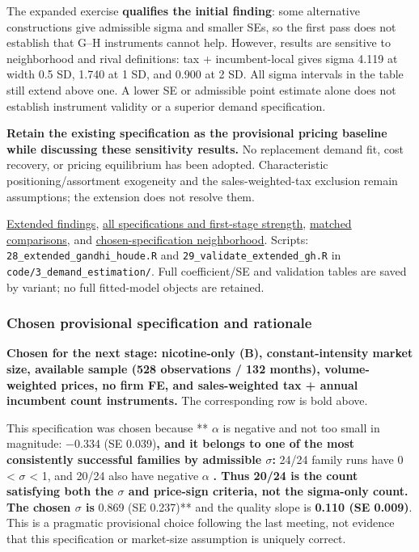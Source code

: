\documentclass[10pt,]{article}
\begin{document}
The expanded exercise \textbf{qualifies the initial finding}: some
alternative constructions give admissible sigma and smaller SEs, so the
first pass does not establish that G--H instruments cannot help.
However, results are sensitive to neighborhood and rival definitions:
tax + incumbent-local gives sigma 4.119 at width 0.5 SD, 1.740 at 1 SD,
and 0.900 at 2 SD. All sigma intervals in the table still extend above
one. A lower SE or admissible point estimate alone does not establish
instrument validity or a superior demand specification.

\textbf{Retain the existing specification as the provisional pricing
baseline while discussing these sensitivity results.} No replacement
demand fit, cost recovery, or pricing equilibrium has been adopted.
Characteristic positioning/assortment exogeneity and the
sales-weighted-tax exclusion remain assumptions; the extension does not
resolve them.

\href{../../output/demand_estimation/gandhi_houde_extended_2026-11-02/findings.txt}{Extended
findings},
\href{../../output/demand_estimation/gandhi_houde_extended_2026-11-02/all_specifications.csv}{all
specifications and first-stage strength},
\href{../../output/demand_estimation/gandhi_houde_extended_2026-11-02/matched_comparison.csv}{matched
comparisons}, and
\href{../../output/demand_estimation/gandhi_houde_extended_2026-11-02/chosen_specification_neighborhood.csv}{chosen-specification
neighborhood}. Scripts: \texttt{28\_extended\_gandhi\_houde.R} and
\texttt{29\_validate\_extended\_gh.R} in
\texttt{code/3\_demand\_estimation/}. Full coefficient/SE and validation
tables are saved by variant; no full fitted-model objects are retained.

\subsubsection{Chosen provisional specification and
rationale}\label{chosen-provisional-specification-and-rationale}

\textbf{Chosen for the next stage: nicotine-only (B), constant-intensity
market size, available sample (528 observations / 132 months),
volume-weighted prices, no firm FE, and sales-weighted tax + annual
incumbent count instruments.} The corresponding row is bold above.

This specification was chosen because ** \(\alpha\) is negative and not
too small in magnitude: −0.334 (SE 0.039)\textbf{, and it belongs to one
of the most consistently successful families by admissible \(\sigma\):
}24/24 family runs have 0 \textless{} \(\sigma\) \textless{} 1, and
20/24 also have negative \(\alpha\) \textbf{. Thus 20/24 is the count
satisfying both the \(\sigma\) and price-sign criteria, not the
sigma-only count. The chosen \(\sigma\) is }0.869 (SE 0.237)** and the
quality slope is \textbf{0.110 (SE 0.009)}. This is a pragmatic
provisional choice following the last meeting, not evidence that this
specification or market-size assumption is uniquely correct.
\end{document}
